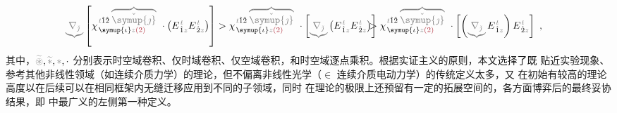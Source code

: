 \begin{subequations}
\begin{align}
	\mathcolor{gray}{\underbrace{\nabla_{\check{\jmath}}}} \left[ \chi^{\;\! \mathcolor{gray}{t} \hat{1} \hat{2} \;\! \mathcolor{gray}{\overbrace{\check{\symup{\jmath}}}}}_{\;\! \symup{\iota} \mathcolor{gray}{z} \textcolor{Maroon}{(2)}} ~\cdot \left( E^{\;\!\mathcolor{gray}{t}}_{\;\! \hat{1} \mathcolor{gray}{z}} E^{\;\!\mathcolor{gray}{t}}_{\;\! \hat{2} \mathcolor{gray}{z}} \right) \right] &> \chi^{\;\! \mathcolor{gray}{t} \hat{1} \hat{2} \;\! \mathcolor{gray}{\overbrace{\check{\symup{\jmath}}}}}_{\;\! \symup{\iota} \mathcolor{gray}{z} \textcolor{Maroon}{(2)}} ~\cdot \left[ \mathcolor{gray}{\underbrace{\nabla_{\check{\jmath}}}} \left( E^{\;\!\mathcolor{gray}{t}}_{\;\! \hat{1} \mathcolor{gray}{z}} E^{\;\!\mathcolor{gray}{t}}_{\;\! \hat{2} \mathcolor{gray}{z}} \right) \right] \hspace{-2em}&&> \chi^{\;\! \mathcolor{gray}{t} \hat{1} \hat{2} \;\! \mathcolor{gray}{\overbrace{\check{\symup{\jmath}}}}}_{\;\! \symup{\iota} \mathcolor{gray}{z} \textcolor{Maroon}{(2)}} ~\cdot \left[ \left( \mathcolor{gray}{\underbrace{\nabla_{\check{\jmath}}}} E^{\;\!\mathcolor{gray}{t}}_{\;\! \hat{1} \mathcolor{gray}{z}} \right) E^{\;\!\mathcolor{gray}{t}}_{\;\! \hat{2} \mathcolor{gray}{z}} \right]~, \label{eq:Volterra-space+time}
\end{align}
\end{subequations}
其中，$\mathcolor{gray}{\widetilde \circledast}, \mathcolor{gray}{\widetilde *}, \mathcolor{gray}{*}, \cdot$ 分别表示时空域卷积、仅时域卷积、仅空域卷积，和时空域逐点乘积。根据实证主义的原则，本文选择了既 {\one} 贴近实验现象、参考其他非线性领域（如连续介质力学）的理论，但不偏离非线性光学（$\in$ 连续介质电动力学）的传统定义太多，又 {\two} 在初始有较高的理论高度以在后续可以在相同框架内无缝迁移应用到不同的子领域，同时 {\three} 在理论的极限上还预留有一定的拓展空间的，各方面博弈后的最终妥协结果，即  中最广义的左侧第一种定义。

